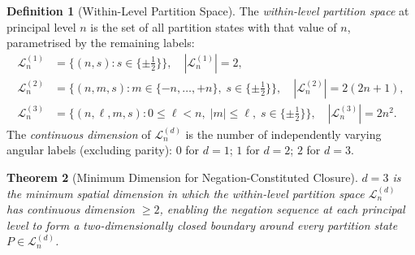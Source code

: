 \documentclass[twocolumn,10pt,a4paper]{article}
\theoremstyle{thmstyle}
\newtheorem{theorem}{Theorem}[section]
\theoremstyle{definition}
\newtheorem{definition}[theorem]{Definition}
\theoremstyle{remark}
\begin{document}
\begin{definition}[Within-Level Partition Space]
\label{def:within-level}
The \emph{within-level partition space} at principal level $n$ is the set of all partition states with that value of $n$, parametrised by the remaining labels:
\begin{align}
    \mathcal{L}_n^{(1)} &= \bigl\{(n, s) : s \in \{{\pm\tfrac{1}{2}}\}\bigr\}, \quad |\mathcal{L}_n^{(1)}| = 2, \\
    \mathcal{L}_n^{(2)} &= \bigl\{(n, m, s) : m \in \{-n,\ldots,+n\},\; s \in \{{\pm\tfrac{1}{2}}\}\bigr\}, \quad |\mathcal{L}_n^{(2)}| = 2(2n+1), \\
    \mathcal{L}_n^{(3)} &= \bigl\{(n, \ell, m, s) : 0 \leq \ell < n,\; |m| \leq \ell,\; s \in \{{\pm\tfrac{1}{2}}\}\bigr\}, \quad |\mathcal{L}_n^{(3)}| = 2n^2.
\end{align}
The \emph{continuous dimension} of $\mathcal{L}_n^{(d)}$ is the number of independently varying angular labels (excluding parity): $0$ for $d = 1$; $1$ for $d = 2$; $2$ for $d = 3$.
\end{definition}

\begin{theorem}[Minimum Dimension for Negation-Constituted Closure]
\label{thm:min-dim}
$d = 3$ is the minimum spatial dimension in which the within-level partition space $\mathcal{L}_n^{(d)}$ has continuous dimension $\geq 2$, enabling the negation sequence at each principal level to form a two-dimensionally closed boundary around every partition state $P \in \mathcal{L}_n^{(d)}$.
\end{theorem}
\end{document}
